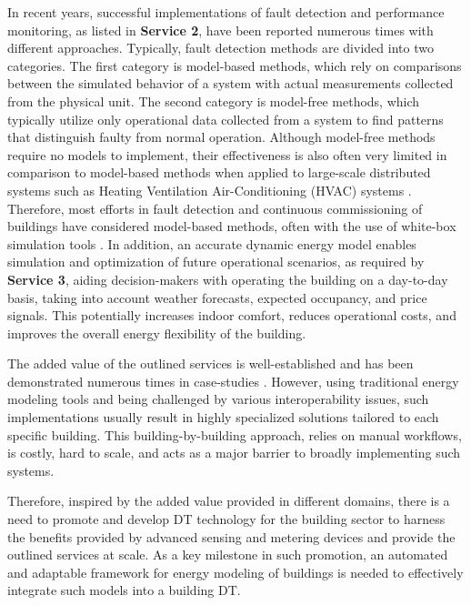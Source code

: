 In recent years, successful implementations of fault detection and performance monitoring, as listed in \textbf{Service 2}, have been reported numerous times with different approaches. Typically, fault detection methods are divided into two categories. The first category is model-based methods, which rely on comparisons between the simulated behavior of a system with actual measurements collected from the physical unit. The second category is model-free methods, which typically utilize only operational data collected from a system to find patterns that distinguish faulty from normal operation. Although model-free methods require no models to implement, their effectiveness is also often very limited in comparison to model-based methods when applied to large-scale distributed systems such as Heating Ventilation Air-Conditioning (HVAC) systems \cite{xiao2009a}. Therefore, most efforts in fault detection and continuous commissioning of buildings have considered model-based methods, often with the use of white-box simulation tools \cite{wang2013a, oneill2014a, markoska2016a, jradi2018a}. In addition, an accurate dynamic energy model enables simulation and optimization of future operational scenarios, as required by \textbf{Service 3}, aiding decision-makers with operating the building on a day-to-day basis, taking into account weather forecasts, expected occupancy, and price signals. This potentially increases indoor comfort, reduces operational costs, and improves the overall energy flexibility of the building. 


The added value of the outlined services is well-established and has been demonstrated numerous times in case-studies \cite{Metallidou2020,Bynum2008,GUNAY2019164}. However, using traditional energy modeling tools and being challenged by various interoperability issues, such implementations usually result in highly specialized solutions tailored to each specific building. This building-by-building approach, relies on manual workflows, is costly, hard to scale, and acts as a major barrier to broadly implementing such systems. 

Therefore, inspired by the added value provided in different domains, there is a need to promote and develop DT technology for the building sector to harness the benefits provided by advanced sensing and metering devices and provide the outlined services at scale. As a key milestone in such promotion, an automated and adaptable framework for energy modeling of buildings is needed to effectively integrate such models into a building DT. 


